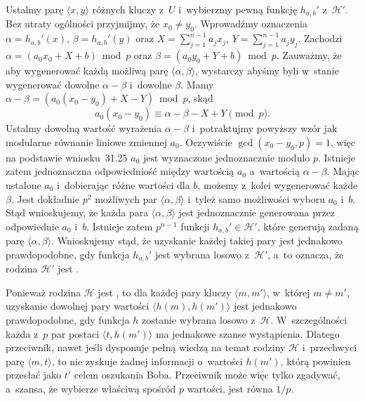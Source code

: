 \subproblem %
Ustalmy parę $\langle x,y\rangle$ różnych kluczy z~$U$ i~wybierzmy pewną funkcję $h_{a,b}'$ z~$\mathcal{H}'$. Bez utraty ogólności przyjmijmy, że $x_0\ne y_0$. Wprowadźmy oznaczenia $\alpha=h_{a,b}'(x)$, $\beta=h_{a,b}'(y)$ oraz $X=\sum_{j=1}^{n-1}a_jx_j$, $Y=\sum_{j=1}^{n-1}a_jy_j$. Zachodzi $\alpha=(a_0x_0+X+b)\bmod p$ oraz $\beta=(a_0y_0+Y+b)\bmod p$. Zauważmy, że aby wygenerować każdą możliwą parę $\langle\alpha,\beta\rangle$, wystarczy abyśmy byli w~stanie wygenerować dowolne $\alpha-\beta$ i~dowolne $\beta$. Mamy $\alpha-\beta=(a_0(x_0-y_0)+X-Y)\bmod p$, skąd
\[
	a_0(x_0-y_0) \equiv \alpha-\beta-X+Y \pmod p.
\]
Ustalmy dowolną wartość wyrażenia $\alpha-\beta$ i~potraktujmy powyższy wzór jak modularne równanie liniowe zmiennej $a_0$. Oczywiście $\gcd(x_0-y_0,p)=1$, więc na podstawie wniosku~31.25 $a_0$ jest wyznaczone jednoznacznie modulo $p$. Istnieje zatem jednoznaczna odpowiedniość między wartością $a_0$ a~wartością $\alpha-\beta$. Mając ustalone $a_0$ i~dobierając różne wartości dla $b$, możemy z~kolei wygenerować każde $\beta$. Jest dokładnie $p^2$ możliwych par $\langle\alpha,\beta\rangle$ i~tyleż samo możliwości wyboru $a_0$ i~$b$. Stąd wnioskujemy, że każda para $\langle\alpha,\beta\rangle$ jest jednoznacznie generowana przez odpowiednie $a_0$ i~$b$. Istnieje zatem $p^{n-1}$ funkcji $h_{a,b}'\in\mathcal{H}'$, które generują zadaną parę $\langle\alpha,\beta\rangle$. Wnioskujemy stąd, że uzyskanie każdej takiej pary jest jednakowo prawdopodobne, gdy funkcja $h_{a,b}'$ jest wybrana losowo z~$\mathcal{H}'$, a~to oznacza, że rodzina $\mathcal{H}'$ jest .

\subproblem %
Ponieważ rodzina $\mathcal{H}$ jest , to dla każdej pary kluczy $\langle m,m'\rangle$, w~której $m\ne m'$, uzyskanie dowolnej pary wartości $\langle h(m),h(m')\rangle$ jest jednakowo prawdopodobne, gdy funkcja $h$ zostanie wybrana losowo z~$\mathcal{H}$. W~szczególności każda z~$p$ par postaci $\langle t,h(m')\rangle$ ma jednakowe szanse wystąpienia. Dlatego przeciwnik, nawet jeśli dysponuje pełną wiedzą na temat rodziny $\mathcal{H}$ i~przechwyci parę $\langle m,t\rangle$, to nie zyskuje żadnej informacji o~wartości $h(m')$, którą powinien przesłać jako $t'$ celem oszukania Boba. Przeciwnik może więc tylko zgadywać, a~szansa, że wybierze właściwą spośród $p$ wartości, jest równa $1/p$.

\endinput
